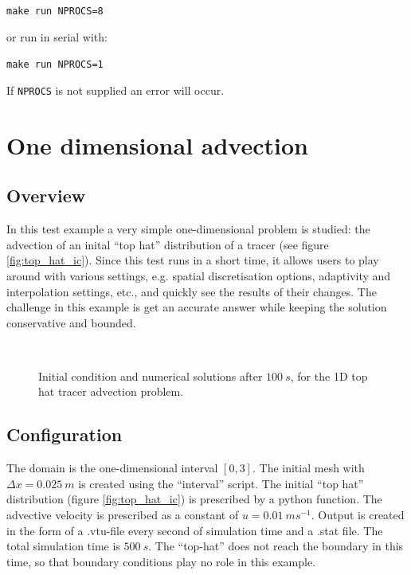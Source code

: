 \hspace{0.05\textwidth}\texttt{make run NPROCS=8}

or run in serial with:

\hspace{0.05\textwidth}\texttt{make run NPROCS=1}

If \texttt{NPROCS} is not supplied an error will occur.


\section{One dimensional advection}
\label{sect:oned_advection}
\subsection{Overview}
In this test example a very simple one-dimensional problem is 
studied: the advection of an inital ``top hat'' distribution 
of a tracer (see figure \ref{fig:top_hat_ic}). Since this test runs in a  
short time, it allows users to play around with various
settings, e.g. spatial discretisation options, adaptivity 
and interpolation settings, etc., and quickly see the results
of their changes. The challenge in this example is get an accurate
answer while keeping the solution conservative and bounded.

\begin{figure}
  \centering
    \label{fig:top_hat_ic}
    \label{fig:top_hat_cg_example} \\
    \label{fig:top_hat_dg}
    \label{fig:top_hat_cv}
  \caption{Initial condition and numerical solutions after $100~s$, for the 1D top hat tracer advection problem.}
\end{figure}

\subsection{Configuration}
The domain is the one-dimensional interval $[0,3]$. The initial 
mesh with $\Delta x=0.025~m$ is created using the ``interval'' 
script. The initial ``top hat'' distribution (figure \ref{fig:top_hat_ic}) is 
prescribed by a python function. The advective velocity is 
prescribed as a constant of $u=0.01~ms^{-1}$. Output is created
in the form of a .vtu-file every second of simulation time
and a .stat file. The total simulation time is $500~s$. 
The ``top-hat'' does not reach the boundary in this time, so that
boundary conditions play no role in this example.

